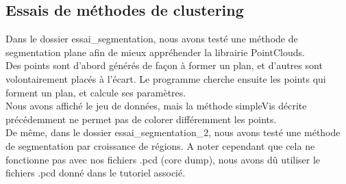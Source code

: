 \subsection{Essais de méthodes de clustering}

Dans le dossier essai\_segmentation, nous avons testé une méthode de segmentation plane afin de mieux appréhender la librairie PointClouds. \\
Des points sont d'abord générés de façon à former un plan, et d'autres sont volontairement placés à l'écart. Le programme cherche ensuite les points qui forment un plan, et calcule ses paramètres. \\
Nous avons affiché le jeu de données, mais la méthode simpleVis décrite précédemment ne permet pas de colorer différemment les points. \\

De même, dans le dossier essai\_segmentation\_2, nous avons testé une méthode de segmentation par croissance de régions. A noter cependant que cela ne fonctionne pas avec nos fichiers .pcd (core dump), nous avons dû utiliser le fichiers .pcd donné dans le tutoriel associé.

